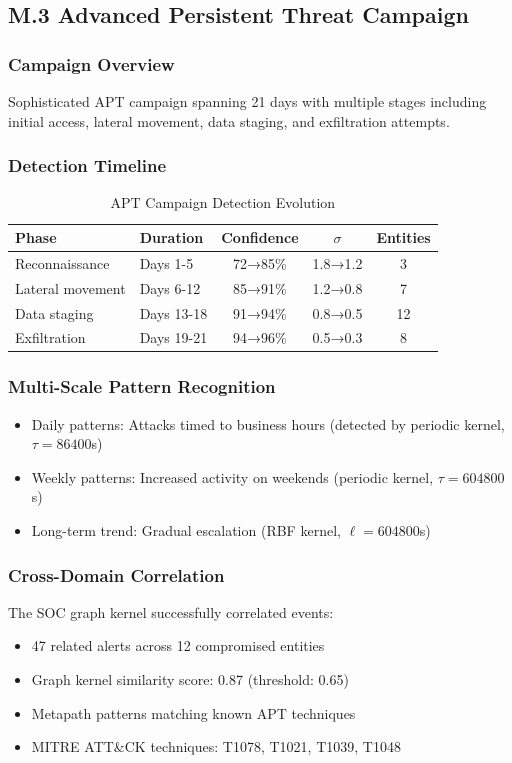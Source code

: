\documentclass[12pt]{article}
\begin{document}
\subsection{M.3 Advanced Persistent Threat Campaign}

\subsubsection{Campaign Overview}
Sophisticated APT campaign spanning 21 days with multiple stages including initial access, lateral movement, data staging, and exfiltration attempts.

\subsubsection{Detection Timeline}
\begin{table}[H]
\centering
\caption{APT Campaign Detection Evolution}
\begin{tabular}{llccc}
\toprule
\textbf{Phase} & \textbf{Duration} & \textbf{Confidence} & \textbf{$\sigma$} & \textbf{Entities} \\
\midrule
Reconnaissance & Days 1-5 & 72→85\% & 1.8→1.2 & 3 \\
Lateral movement & Days 6-12 & 85→91\% & 1.2→0.8 & 7 \\
Data staging & Days 13-18 & 91→94\% & 0.8→0.5 & 12 \\
Exfiltration & Days 19-21 & 94→96\% & 0.5→0.3 & 8 \\
\bottomrule
\end{tabular}
\end{table}

\subsubsection{Multi-Scale Pattern Recognition}
\begin{itemize}
\item Daily patterns: Attacks timed to business hours (detected by periodic kernel, $\tau=86400$s)
\item Weekly patterns: Increased activity on weekends (periodic kernel, $\tau=604800$s)
\item Long-term trend: Gradual escalation (RBF kernel, $\ell=604800$s)
\end{itemize}

\subsubsection{Cross-Domain Correlation}
The SOC graph kernel successfully correlated events:
\begin{itemize}
\item 47 related alerts across 12 compromised entities
\item Graph kernel similarity score: 0.87 (threshold: 0.65)
\item Metapath patterns matching known APT techniques
\item MITRE ATT\&CK techniques: T1078, T1021, T1039, T1048
\end{itemize}
\end{document}
